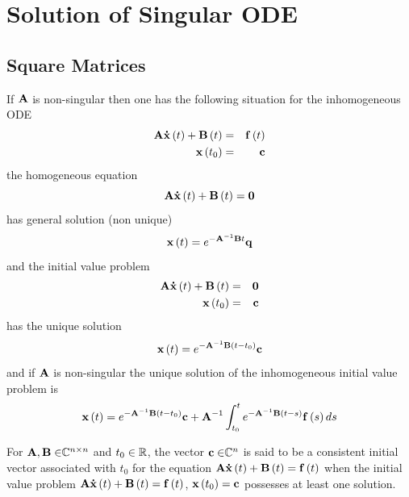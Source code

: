                       

\section{Solution of Singular ODE}

\subsection{Square Matrices}

If ${\bf A}$ is non-singular then one has the following situation for the
inhomogeneous ODE 
\begin{eqnarray}
{\bf A\dot{x}}\left( t\right) +{\bf B}\left( t\right) &=&{\bf f}\left(
t\right)  \nonumber \\
{\bf x}\left( t_{0}\right) &=&{\bf c}
\end{eqnarray}%
the homogeneous equation 
\begin{equation}
{\bf A\dot{x}}\left( t\right) +{\bf B}\left( t\right) ={\bf 0}
\end{equation}%
has general solution (non unique) 
\begin{equation}
{\bf x}\left( t\right) =e^{-{\bf A}^{-1}{\bf B}t}{\bf q}
\end{equation}%
and the initial value problem 
\begin{eqnarray}
{\bf A\dot{x}}\left( t\right) +{\bf B}\left( t\right) &=&{\bf 0}  \nonumber
\\
{\bf x}\left( t_{0}\right) &=&{\bf c}
\end{eqnarray}%
has the unique solution 
\begin{equation}
{\bf x}\left( t\right) =e^{-{\bf A}^{-1}{\bf B}\left( t-t_{0}\right) }{\bf c}
\end{equation}%
and if ${\bf A}$ is non-singular the unique solution of the inhomogeneous
initial value problem is 
\begin{equation}
{\bf x}\left( t\right) =e^{-{\bf A}^{-1}{\bf B}\left( t-t_{0}\right) }{\bf %
c+A}^{-1}\int_{t_{0}}^{t}e^{-{\bf A}^{-1}{\bf B}\left( t-s\right) }{\bf f}%
\left( s\right) ds
\end{equation}

\begin{definition}
For ${\bf A,B\in }{\Bbb C}^{n\times n}$ and $t_{0}\in {\Bbb R}$, the vector $%
{\bf c\in }{\Bbb C}^{n}$ is said to be a consistent initial vector
associated with $t_{0}$ for the equation ${\bf A\dot{x}}\left( t\right) +%
{\bf B}\left( t\right) ={\bf f}\left( t\right) $ when the initial value
problem ${\bf A\dot{x}}\left( t\right) +{\bf B}\left( t\right) ={\bf f}%
\left( t\right) $, ${\bf x}\left( t_{0}\right) ={\bf c}$ possesses at least
one solution.
\end{definition}

